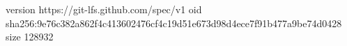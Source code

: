 version https://git-lfs.github.com/spec/v1
oid sha256:9e76c382a862f4c413602476cf4c19d51e673d98d4ece7f91b477a9be74d0428
size 128932
